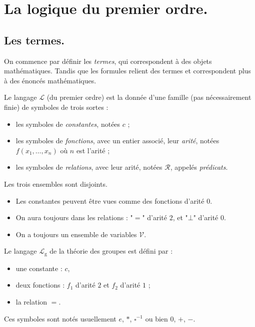 \documentclass[./main]{subfiles}
\begin{document}
  \chapter{La logique du premier ordre.}

  \section{Les termes.}

  On commence par définir les \textit{termes}, qui correspondent à des objets mathématiques.
  Tandis que les formules relient des termes et correspondent plus à des énoncés mathématiques.

  \begin{defn}
    Le langage $\mathcal{L}$ (du premier ordre)
    est la donnée d'une famille (pas nécessairement finie) de symboles de trois sortes :
    \begin{itemize}
      \item les symboles de \textit{constantes}, notées $c$ ;
      \item les symboles de \textit{fonctions}, avec un entier associé, leur \textit{arité}, notées $f(x_1, \ldots, x_n)$ où $n$ est l'arité ;
      \item les symboles de \textit{relations}, avec leur arité, notées $\mathcal{R}$, appelés \textit{prédicats}.
    \end{itemize}
    Les trois ensembles sont disjoints.
  \end{defn}

  \begin{rmk}
    \begin{itemize}
      \item Les constantes peuvent être vues comme des fonctions d'arité $0$.
      \item On aura toujours dans les relations : "$=$" d'arité $2$, et "$\bot$" d'arité $0$.
      \item On a toujours un ensemble de variables $\mathcal{V}$.
    \end{itemize}
  \end{rmk}

  \begin{exm}
    Le langage $\mathcal{L}_\mathrm{g}$ de la théorie des groupes est défini par :
    \begin{itemize}
      \item une constante : $c$,
      \item deux fonctions : $f_1$ d'arité $2$ et $f_2$ d'arité $1$ ;
      \item la relation $=$.
    \end{itemize}
    Ces symboles sont notés usuellement $e$, $*$, $\square^{-1}$ ou bien $0$, $+$, $-$.
  \end{exm}
\end{document}
